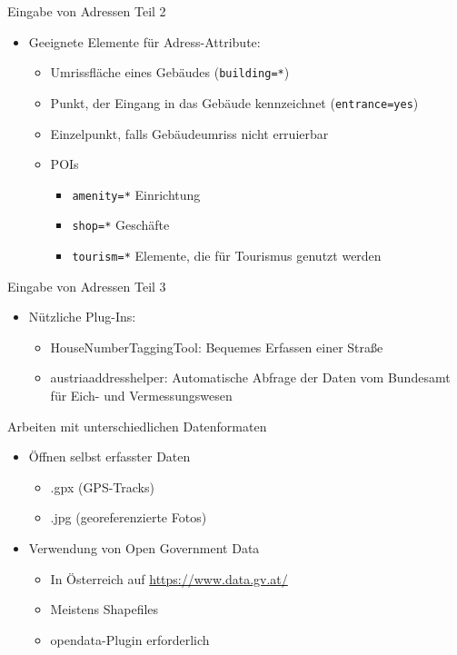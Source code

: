 \documentclass{beamer}
\begin{document}
\begin{frame}{Eingabe von Adressen Teil 2}
\begin{itemize}
  \item Geeignete Elemente für Adress-Attribute:
  \begin{itemize}
    \item Umrissfläche eines Gebäudes (\texttt{building=*})
    \item Punkt, der Eingang in das Gebäude kennzeichnet (\texttt{entrance=yes})
    \item Einzelpunkt, falls Gebäudeumriss nicht erruierbar
    \item POIs
    \begin{itemize}
      \item \texttt{amenity=*} Einrichtung
      \item \texttt{shop=*} Geschäfte
      \item \texttt{tourism=*} Elemente, die für Tourismus genutzt werden
    \end{itemize}
  \end{itemize}
\end{itemize}

\end{frame}

\begin{frame}{Eingabe von Adressen Teil 3}
\begin{itemize}
  \item Nützliche Plug-Ins:
  \begin{itemize}
    \item HouseNumberTaggingTool: Bequemes Erfassen einer Straße
    \item austriaaddresshelper: Automatische Abfrage der Daten vom Bundesamt für Eich- und Vermessungswesen
  \end{itemize}
\end{itemize}

\end{frame}

\begin{frame}{Arbeiten mit unterschiedlichen Datenformaten}
\begin{itemize}
  \item Öffnen selbst erfasster Daten
  \begin{itemize}
    \item .gpx (GPS-Tracks)
    \item .jpg (georeferenzierte Fotos)
  \end{itemize}
  \item Verwendung von Open Government Data
  \begin{itemize}
    \item In Österreich auf \url{https://www.data.gv.at/}  
    \item Meistens Shapefiles
    \item opendata-Plugin erforderlich
  \end{itemize}
\end{itemize}
\end{frame}
\end{document}
